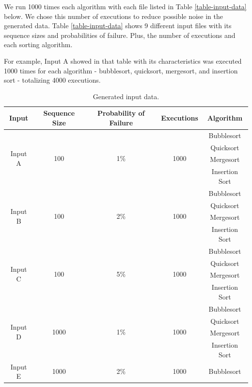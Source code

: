 We run 1000 times each algorithm with each file listed in Table \ref{table-input-data} below. We chose this number of executions to reduce possible noise in the generated data. Table \ref{table-input-data} shows 9 different input files with its sequence sizes and probabilities of failure. Plus, the number of executions and each sorting algorithm.

For example, Input A showed in that table with its characteristics was executed 1000 times for each algorithm -  bubblesort, quicksort, mergesort, and insertion sort - totalizing 4000 executions.

\begin{table}[H]
    \caption{Generated input data.}
    \begin{center}
    \begin{tabular}{|c|c|c|c|c|}
    \hline
    \textbf{Input} & \textbf{Sequence Size} & \textbf{Probability of Failure} & \textbf{Executions} & \textbf{Algorithm} \\ 
    \hline
    \multirow{4}{*}{Input A} & \multirow{4}{*}{100} & \multirow{4}{*}{1\%} & \multirow{4}{*}{1000} & Bubblesort \\ 
    & & & & Quicksort \\
    & & & & Mergesort \\
    & & & & Insertion Sort \\
    \hline
    \multirow{4}{*}{Input B} & \multirow{4}{*}{100} & \multirow{4}{*}{2\%} & \multirow{4}{*}{1000} & Bubblesort \\ 
    & & & & Quicksort \\
    & & & & Mergesort \\
    & & & & Insertion Sort \\
    \hline
    \multirow{4}{*}{Input C} & \multirow{4}{*}{100} & \multirow{4}{*}{5\%} & \multirow{4}{*}{1000} & Bubblesort \\ 
    & & & & Quicksort \\
    & & & & Mergesort \\
    & & & & Insertion Sort \\
    \hline
    \multirow{4}{*}{Input D} & \multirow{4}{*}{1000} & \multirow{4}{*}{1\%} & \multirow{4}{*}{1000} & Bubblesort \\ 
    & & & & Quicksort \\
    & & & & Mergesort \\
    & & & & Insertion Sort \\
    \hline
    \multirow{4}{*}{Input E} & \multirow{4}{*}{1000} & \multirow{4}{*}{2\%} & \multirow{4}{*}{1000} & Bubblesort \\ 

\end{tabular}
\end{center}
\end{table}
